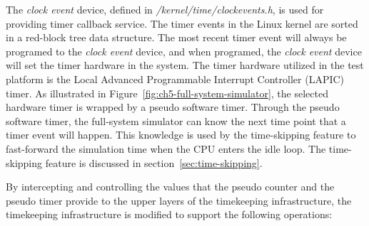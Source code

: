 The \textit{clock event} device, defined in \textit{/kernel/time/clockevents.h}, is used for providing timer callback service. The timer events in the Linux kernel are sorted in a red-block tree data structure. The most recent timer event will always be programed to the \textit{clock event} device, and when programed, the \textit{clock event} device will set the timer hardware in the system. The timer hardware utilized in the test platform is the Local Advanced Programmable Interrupt Controller (LAPIC) timer. As illustrated in Figure~\ref{fig:ch5-full-system-simulator}, the selected hardware timer is wrapped by a pseudo software timer. Through the pseudo software timer, the full-system simulator can know the next time point that a timer event will happen. This knowledge is used by the time-skipping feature to fast-forward the simulation time when the CPU enters the idle loop. The time-skipping feature is discussed in section~\ref{sec:time-skipping}.

By intercepting and controlling the values that the pseudo counter and the pseudo timer provide to the upper layers of the timekeeping infrastructure, the timekeeping infrastructure is modified to support the following operations:

